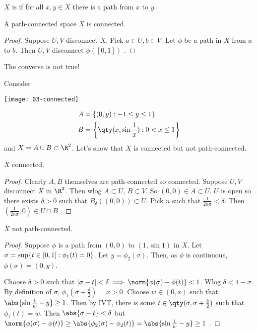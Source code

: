 \begin{definition}
    $X$ is  if for all $x,y\in X$ there is a path from $x$ to $y$.
\end{definition} 

\begin{proposition} \label{prp:46}
    A path-connected space $X$ is connected.
\end{proposition}

\begin{proof}
    Suppose $U,V$ disconnect $X$. Pick $a\in U, b\in V$. Let $\phi$ be a path in $X$ from $a$ to $b$. Then $U,V$ disconnect $\phi([0,1])$ \Lightning.
\end{proof}

\begin{warning}
    The converse is not true!
\end{warning} 

\begin{example}
Consider 
{\par 
\centering 
\texttt{[image: 03-connected]} 
\par}
\begin{align*}
    A &= \Set{(0,y)}{-1\leq y \leq 1} \\
    B &= \left\{ \qty(x,\sin \frac{1}{x}) : 0< x\leq 1 \right\}
\end{align*}
and $X = A\cup B \subset \R^2$. Let's show that $X$ is connected but not path-connected.
\end{example}

\begin{claim}
    $X$ connected.
\end{claim} 

\begin{proof}
    Clearly $A,B$ themselves are path-connected so connected. 
    Suppose $U,V$ disconnect $X$ in $\R^2$. 
    Then wlog $A\subset U$, $B\subset V$. 
    So $(0,0)\in A\subset U$. $U$ is open so there exists $\delta>0$ such that $B_\delta((0,0))\subset U$. 
    Pick $n$ such that $\frac{1}{2n\pi}<\delta$. Then $(\frac{1}{2n\pi},0)\in U\cap B$ \Lightning.
\end{proof}

\begin{claim}
    $X$ not path-connected.
\end{claim} 

\begin{proof}
    Suppose $\phi$ is a path from $(0,0)$ to $(1,\sin 1)$ in $X$. 
    Let $\sigma = \sup\{t\in [0,1] : \phi_1(t) = 0\}$. 
    Let $y = \phi_2(\sigma)$.
    Then, as $\phi$ is continuous, $\phi(\sigma) = (0,y)$.

    Choose $\delta > 0$ such that $|\sigma - t| <\delta \implies \norm{\phi(\sigma) - \phi(t)} < 1$. 
    Wlog $\delta < 1-\sigma$. By definition of $\sigma$, $\phi_1(\sigma + \frac{\delta}{2}) = x > 0$. 
    Choose $w\in (0,x)$ such that $\abs{\sin \frac{1}{w} - y} \geq 1$. 
    Then by IVT, there is some $t\in \qty(\sigma, \sigma +\frac{\delta}{2})$ such that $\phi_1(t) = w$. Then $\abs{\sigma - t} < \delta$ but $\norm{\phi(\sigma) - \phi(t)} \geq \abs{\phi_2(\sigma) - \phi_2(t)} = \abs{\sin\frac{1}{w} - y} \geq 1$ \Lightning.
\end{proof}

